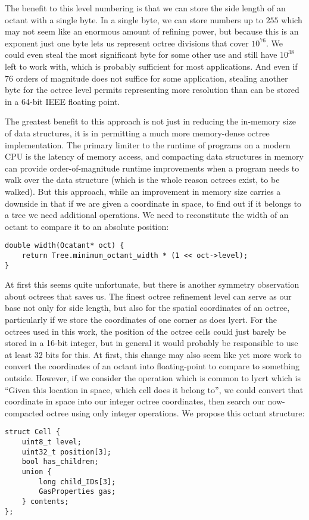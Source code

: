The benefit to this level numbering is that we can store the side length of an octant with a single byte.
In a single byte, we can store numbers up to $255$ which may not seem like an enormous amount of refining power, but because this is an exponent just one byte lets us represent octree divisions that cover $10^{76}$.
We could even steal the most significant byte for some other use and still have $10^{38}$ left to work with, which is probably sufficient for most applications.
And even if $76$ orders of magnitude does not suffice for some application, stealing another byte for the octree level permits representing more resolution than can be stored in a 64-bit IEEE floating point.

The greatest benefit to this approach is not just in reducing the in-memory size of data structures, it is in permitting a much more memory-dense octree implementation.
The primary limiter to the runtime of programs on a modern CPU is the latency of memory access, and compacting data structures in memory can provide order-of-magnitude runtime improvements when a program needs to walk over the data structure (which is the whole reason octrees exist, to be walked).
But this approach, while an improvement in memory size carries a downside in that if we are given a coordinate in space, to find out if it belongs to a tree we need additional operations.
We need to reconstitute the width of an octant to compare it to an absolute position:
\begin{lstlisting}
double width(Ocatant* oct) {
    return Tree.minimum_octant_width * (1 << oct->level);
}
\end{lstlisting}

At first this seems quite unfortunate, but there is another symmetry observation about octrees that saves us.
The finest octree refinement level can serve as our base not only for side length, but also for the spatial coordinates of an octree, particularly if we store the coordinates of one corner as does {\sc lycrt}.
For the octrees used in this work, the position of the octree cells could just barely be stored in a 16-bit integer, but in general it would probably be responsible to use at least 32 bits for this.
At first, this change may also seem like yet more work to convert the coordinates of an octant into floating-point to compare to something outside.
However, if we consider the operation which is common to {\sc lycrt} which is ``Given this location in space, which cell does it belong to'', we could convert that coordinate in space into our integer octree coordinates, then search our now-compacted octree using only integer operations.
We propose this octant structure:
\begin{lstlisting}
struct Cell {
    uint8_t level;
    uint32_t position[3];
    bool has_children;
    union {
        long child_IDs[3];
        GasProperties gas;
    } contents;
};
\end{lstlisting}
